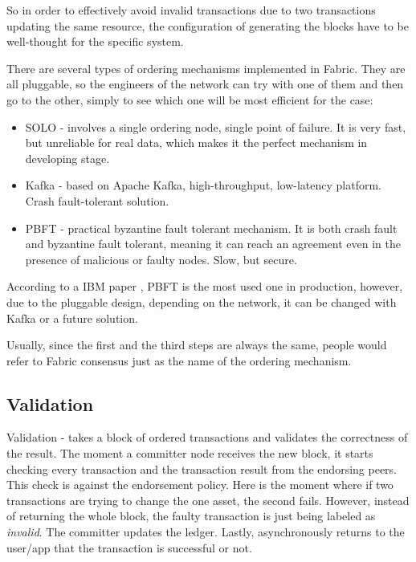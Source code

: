 \documentclass[a4paper,11pt]{report}
\begin{document}
	So in order to effectively avoid invalid transactions due to two transactions updating the same resource, the configuration of generating the blocks have to be well-thought for the specific system. 
	
There are several types of ordering mechanisms implemented in Fabric. They are all pluggable, so the engineers of the network can try with one of them and then go to the other, simply to see which one will be most efficient for the case: 
\begin{itemize}
\item SOLO - involves a single ordering node, single point of failure. It is very fast, but unreliable for real data, which makes it the perfect mechanism in developing stage. 
\item Kafka - based on Apache Kafka, high-throughput, low-latency platform. Crash fault-tolerant solution. 
\item PBFT - practical byzantine fault tolerant mechanism. It is both crash fault and byzantine fault tolerant, meaning it can reach an agreement even in the presence of malicious or faulty nodes. Slow, but secure.
\end{itemize}
According to a IBM paper \cite{cachin2016architecture}, PBFT is the most used one in production, however, due to the pluggable design, depending on the network, it can be changed with Kafka or a future solution.

Usually, since the first and the third steps are always the same, people would refer to Fabric consensus just as the name of the ordering mechanism.

\subsection{Validation}

Validation - takes a block of ordered transactions and validates the correctness of the result. 
	The moment a committer node receives the new block, it starts checking every transaction and the transaction result from the endorsing peers. This check is against the endorsement policy. Here is the moment where if two transactions are trying to change the one asset, the second fails. However, instead of returning the whole block, the faulty transaction is just being labeled as \textit{invalid}. The committer updates the ledger. Lastly, asynchronously returns to the user/app that the transaction is successful or not. 
\end{document}
